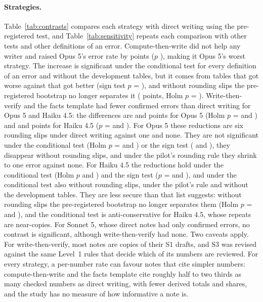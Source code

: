 \documentclass[11pt]{article}
\begin{document}
\paragraph{Strategies.} Table~\ref{tab:contrasts} compares each strategy with direct writing using the pre-registered test, and Table~\ref{tab:sensitivity} repeats each comparison with other tests and other definitions of an error. Compute-then-write did not help any writer and raised Opus 5's error rate by \DiffOpusTwo{} points ($p$ \DiffPOpusTwo{}), making it Opus 5's worst strategy. The increase is significant under the conditional test for every definition of an error and without the development tables, but it comes from \SignUpOpusTwo{} tables that got worse against \SignDownOpusTwo{} that got better (sign test $p$ = \SignPOpusTwo{}), and without rounding slips the pre-registered bootstrap no longer separates it (\SubstDiffOpusTwo{} points, Holm $p$ = \SubstDiffPOpusTwo{}). Write-then-verify and the facts template had fewer confirmed errors than direct writing for Opus 5 and Haiku 4.5: the differences are \DiffOpusThree{} and \DiffOpusFour{} points for Opus 5 (Holm $p$ = \DiffPOpusThree{} and \DiffPOpusFour{}) and \DiffHaikuThree{} and \DiffHaikuFour{} points for Haiku 4.5 ($p$ = \DiffPHaikuThree{} and \DiffPHaikuFour{}). For Opus 5 these reductions are six rounding slips under direct writing against one and none. They are not significant under the conditional test (Holm $p$ = \CondPOpusThree{} and \CondPOpusFour{}) or the sign test (\SignPOpusThree{} and \SignPOpusFour{}), they disappear without rounding slips, and under the pilot's rounding rule they shrink to one error against none. For Haiku 4.5 the reductions hold under the conditional test (Holm $p$ \CondPHaikuThree{} and \CondPHaikuFour{}) and the sign test ($p$ = \SignPHaikuThree{} and \SignPHaikuFour{}), and under the conditional test also without rounding slips, under the pilot's rule and without the development tables. They are less secure than that list suggests: without rounding slips the pre-registered bootstrap no longer separates them (Holm $p$ = \SubstDiffPHaikuThree{} and \SubstDiffPHaikuFour{}), and the conditional test is anti-conservative for Haiku 4.5, whose repeats are near-copies. For Sonnet 5, whose direct notes had only \ConfNSonnetOne{} confirmed errors, no contrast is significant, although write-then-verify had none. Two caveats apply. For write-then-verify, most notes are copies of their S1 drafts, and S3 was revised against the same Level~1 rules that decide which of its numbers are reviewed. For every strategy, a per-number rate can favour notes that cite simpler numbers: compute-then-write and the facts template cite roughly half to two thirds as many checked numbers as direct writing, with fewer derived totals and shares, and the study has no measure of how informative a note is.
\end{document}
